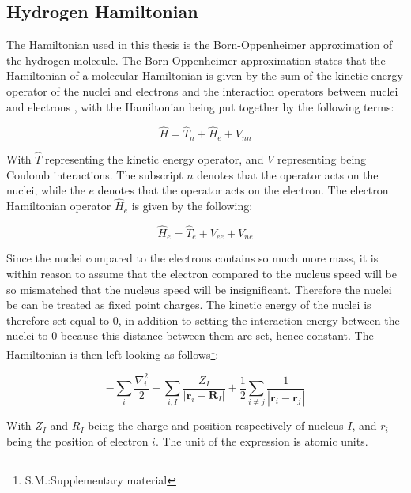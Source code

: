\documentclass[../main.tex]{subfiles}
\begin{document}
\subsection{Hydrogen Hamiltonian}
The Hamiltonian used in this thesis is the Born-Oppenheimer approximation of the hydrogen molecule. The Born-Oppenheimer approximation states that the Hamiltonian of a molecular Hamiltonian is given by the sum of the kinetic energy operator of the nuclei and electrons and the interaction operators between nuclei and electrons \cite{boopa}, with the Hamiltonian being put together by the following terms:

\begin{equation*}
\hat{H}=\hat{T}_{n}+\hat{H}_{e}+V_{n n}
\end{equation*}

With $\hat{T}$ representing the kinetic energy operator, and $V$ representing being Coulomb interactions. The subscript $n$ denotes that the operator acts on the nuclei, while the $e$ denotes that the operator acts on the electron. The electron Hamiltonian operator $\hat{H}_e$ is given by the following:

\begin{equation*}
     \hat{H}_{e}=\hat{T}_{e}+V_{e e}+V_{n e}
\end{equation*}

Since the nuclei compared to the electrons contains so much more mass, it is within reason to assume that the electron compared to the nucleus speed will be so mismatched that the nucleus speed will be insignificant. Therefore the nuclei be can be treated as fixed point charges. The kinetic energy of the nuclei is therefore set equal to $0$, in addition to setting the interaction energy between the nuclei to $0$ because this distance between them are set, hence constant. The Hamiltonian is then left looking as follows\cite[S.M.]{McArdle_2019}\footnote[1]{S.M.:Supplementary material}:

\begin{equation*}
-\sum_{i} \frac{\nabla_{i}^{2}}{2}-\sum_{i, I} \frac{Z_{I}}{\left|\mathbf{r}_{i}-\mathbf{R}_{I}\right|}+\frac{1}{2} \sum_{i \neq j} \frac{1}{\left|\mathbf{r}_{i}-\mathbf{r}_{j}\right|}
\end{equation*}

With $Z_I$ and $R_I$ being the charge and position respectively of nucleus $I$, and $r_i$ being the position of electron $i$. The unit of the expression is atomic units.

\end{document}
